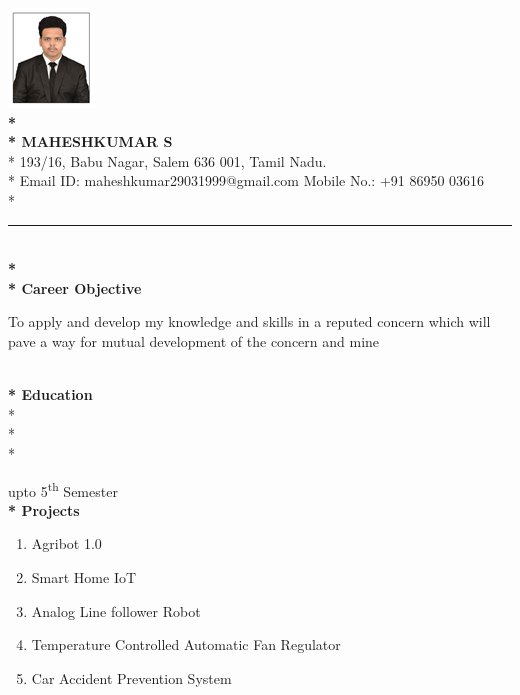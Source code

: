 \documentclass{article}
\begin{document}
\includegraphics[scale=0.7]{smk.png}
 \textbf{\LARGE \\* \\* MAHESHKUMAR S}
\\* \large 193/16, Babu Nagar, Salem 636 001, Tamil Nadu. 
\\* \large Email ID: maheshkumar29031999@gmail.com    
\hspace{10pt}Mobile No.: +91 86950 03616  
\\*
\hrule

\textbf{\\*  \\* Career Objective}

To apply and develop my knowledge and skills in a reputed concern which will pave a way for mutual development of the concern and mine

 \textbf{\\* Education}
\\*  
\\* 
\\* 

\hspace{422pt} \footnotesize *upto 5\textsuperscript{th} Semester
\large
\textbf{\\* Projects}
\begin{enumerate}
\item Agribot 1.0
\item Smart Home IoT
\item Analog Line follower Robot
\item Temperature Controlled Automatic Fan Regulator
\item Car Accident Prevention System
\end{enumerate}
\end{document}
